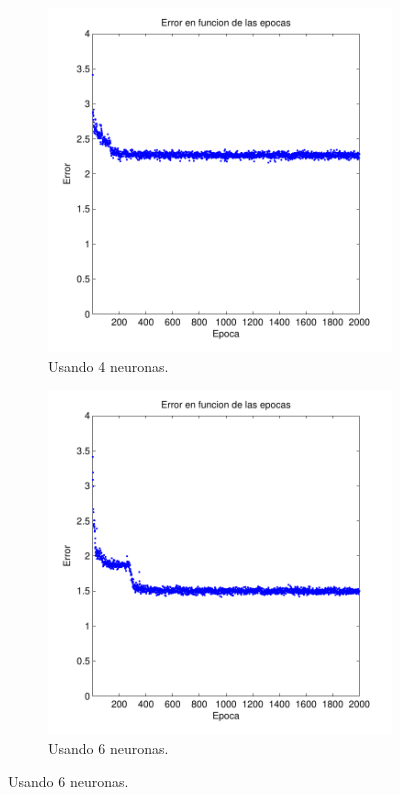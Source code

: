 \documentclass[informe.tex]{subfiles}
\begin{document}
\begin{figure}[H]
\begin{subfigure}[b]{0.32\textwidth}
                \includegraphics[width=\textwidth]{graficos/error_fold2_4_binary-regresion_2000_01.pdf}
                \caption{Usando 4 neuronas.}
                \label{fig:d2-f2-2k-01-n4}
        \end{subfigure}
        \begin{subfigure}[b]{0.32\textwidth}
                \includegraphics[width=\textwidth]{graficos/error_fold2_6_binary-regresion_2000_01.pdf}
                \caption{Usando 6 neuronas.}
                \label{fig:d2-f2-2k-01-n6}
        \end{subfigure}
        

\end{figure}
\end{document}
